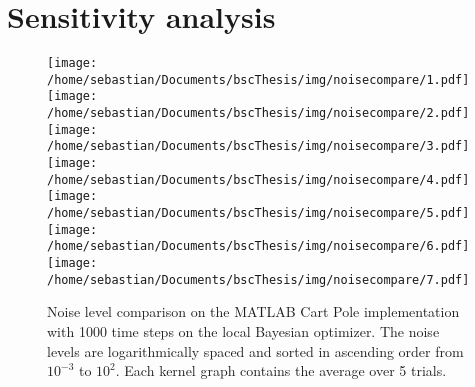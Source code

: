 \newpage
\section{Sensitivity analysis}
\begin{figure}[H]
\centering
\texttt{[image: /home/sebastian/Documents/bscThesis/img/noisecompare/1.pdf]}
\texttt{[image: /home/sebastian/Documents/bscThesis/img/noisecompare/2.pdf]}
\texttt{[image: /home/sebastian/Documents/bscThesis/img/noisecompare/3.pdf]}
\texttt{[image: /home/sebastian/Documents/bscThesis/img/noisecompare/4.pdf]}
\texttt{[image: /home/sebastian/Documents/bscThesis/img/noisecompare/5.pdf]}
\texttt{[image: /home/sebastian/Documents/bscThesis/img/noisecompare/6.pdf]}
\texttt{[image: /home/sebastian/Documents/bscThesis/img/noisecompare/7.pdf]}
\caption{Noise level comparison on the MATLAB Cart Pole implementation with 1000 time steps on the local Bayesian optimizer. The noise levels are logarithmically spaced and sorted in ascending order from $10^{-3}$ to $10^2$. Each kernel graph contains the average over 5 trials.}
\label{fig:noisecompare}
\end{figure}

